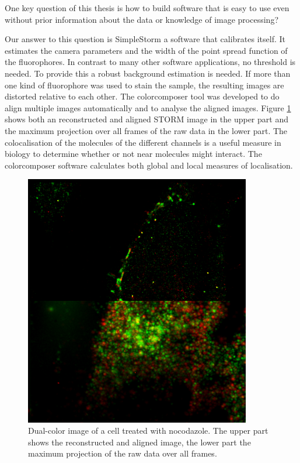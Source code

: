 One key question of this thesis is how to build software that is easy to use even without prior information about the data or knowledge of image processing? \newline

Our answer to this question is SimpleStorm a software that calibrates itself. It estimates the camera parameters and the width of the point spread function of the fluorophores. In contrast to many other software applications, no threshold is needed. To provide this a robust background estimation is needed.\newline
If more than one kind of fluorophore was used to stain the sample, the resulting images are distorted relative to each other. The colorcomposer tool was developed to do align multiple images automatically and to analyse the aligned images. Figure \ref{dualcolor} shows both an reconstructed and aligned STORM image in the upper part and the maximum projection over all frames of the raw data in the lower part. The colocalisation of the molecules of the different channels is a useful measure in biology to determine whether or not near molecules might interact. The colorcomposer software calculates both global and local measures of localisation.

\begin{figure}
\centering
\includegraphics[width = 0.88\textwidth]{pictures/alignedStormWidefield.png}
	\caption{Dual-color image of a cell treated with nocodazole. The upper part shows the reconstructed and aligned image, the lower part the maximum projection of the raw data over all frames.}
	\label{dualcolor}
\end{figure}


